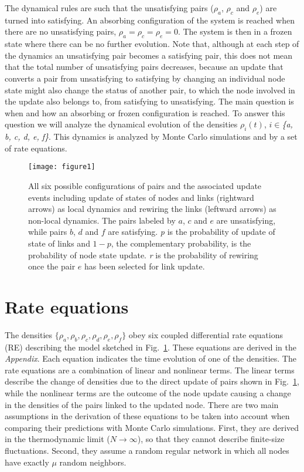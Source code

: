\documentclass[aps,pre,notitlepage]{revtex4-1}
\begin{document}
The dynamical rules are such that the unsatisfying pairs ($\rho_{a}$, $\rho_{c}$ and $\rho_{e}$) are turned into satisfying. An absorbing configuration of the system \cite{hinrichsen2000non} is reached when there are no unsatisfying pairs, $\rho_{a}=\rho_{c}=\rho_{e}=0$. The system is then in a frozen state where there can be no further evolution. Note that, although at each step of the dynamics an unsatisfying pair becomes a satisfying pair, this does not mean that the total number of unsatisfying pairs decreases, because an update that converts a pair from unsatisfying to satisfying by changing an individual node state might also change the status of another pair, to which the node involved in the update also belongs to, from
satisfying to unsatisfying. The main question is when and how an absorbing or frozen configuration is reached. To answer this question we will analyze the dynamical evolution of the densities $\rho_i(t)$, \textit{$i\in$\{a, b, c, d, e, f\}}. This dynamics is analyzed by Monte Carlo simulations and by a set of rate equations.

\begin{figure}[t]
\centering
\texttt{[image: figure1]}
\caption{All six possible configurations of pairs and the associated update events including update of states of nodes and links (rightward arrows) as local dynamics and rewiring the links (leftward arrows) as non-local dynamics. The pairs labeled by $a$, $c$ and $e$ are unsatisfying, while pairs $b$, $d$ and $f$ are satisfying. \textit{p} is the probability of update of state of links and $1-p$, the complementary probability, is the probability of node state update. \textit{r} is the probability of rewiring once the pair $e$ has been selected for link update.}
\label{update_rule_Co}
\end{figure}

\section*{Rate equations}
The densities $\{\rho_a,\rho_b,\rho_c,\rho_d,\rho_e,\rho_f\}$ obey six coupled differential rate equations (RE) describing the model sketched in Fig.~\ref{update_rule_Co}. These equations are derived in the \textit{Appendix}. Each equation indicates the time evolution of one of the densities. The rate equations are a combination of linear and nonlinear terms. The linear terms describe the change of densities due to the direct update of pairs shown in Fig.~\ref{update_rule_Co}, while the nonlinear terms are the outcome of the node update causing a change in the densities of the pairs linked to the updated node. There are two main assumptions in the derivation of these equations to be taken into account when comparing their predictions with Monte Carlo simulations. First, they are derived in the thermodynamic limit ($N\rightarrow\infty$), so that they cannot describe finite-size fluctuations. Second, they assume a random regular network in which all nodes have exactly $\mu$ random neighbors.
\end{document}

